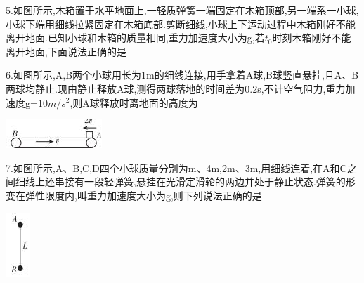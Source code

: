 \begin{solution}{4cm}

\end{solution}



\question[6] 5.如图所示,木箱置于水平地面上,一轻质弹簧一端固定在木箱顶部,另一端系一小球,小球下端用细线拉紧固定在木箱底部.剪断细线,小球上下运动过程中木箱刚好不能离开地面.已知小球和木箱的质量相同,重力加速度大小为g,若$t_0$时刻木箱刚好不能离开地面,下面说法正确的是
\begin{solution}{4cm}

\end{solution}



\question[6] 6.如图所示,A,B两个小球用长为1m的细线连接,用手拿着A球,B球竖直悬挂,且A、B两球均静止.现由静止释放A球,测得两球落地的时间差为0.2s,不计空气阻力,重力加速度g=$10m/s^2$,则A球释放时离地面的高度为
\begin{center}
\includegraphics[]{img/image6.jpeg}
\end{center}

\begin{solution}{4cm}

\end{solution}



\question[6] 7.如图所示,A、B,C,D四个小球质量分别为m、4m,2m、3m,用细线连着,在A和C之间细线上还串接有一段轻弹簧,悬挂在光滑定滑轮的两边并处于静止状态.弹簧的形变在弹性限度内,叫重力加速度大小为g,则下列说法正确的是
\begin{center}
\includegraphics[]{img/image7.jpeg}
\end{center}

\begin{solution}{4cm}

\end{solution}



